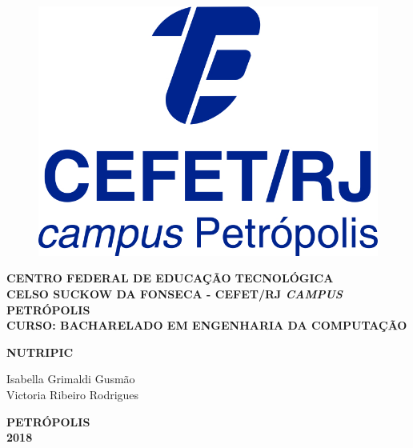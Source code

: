 \begin{figure}
\center
\includegraphics[height=0.15\textwidth]{Figs/logoCefetCampusPetropolis.jpg} 
\end{figure}


\vspace*{0.8cm}

\begin{center}
{\large \bf CENTRO FEDERAL DE EDUCAÇÃO TECNOLÓGICA} \vspace{1mm} \\
{\large \bf CELSO SUCKOW DA FONSECA - CEFET/RJ \textit{CAMPUS} PETRÓPOLIS} \vspace{1mm} \\
{\large \bf CURSO: BACHARELADO EM ENGENHARIA DA COMPUTAÇÃO}

\vspace*{5cm}
{\large \bf NUTRIPIC } \\
\end{center}
\vspace{4cm}
\hfill
	\begin{flushright}
	Isabella Grimaldi Gusmão \\
	Victoria Ribeiro Rodrigues
	\end{flushright}


\vspace*{3.3cm}
\begin{center}
{\bf PETRÓPOLIS \\ 2018}\\
\end{center}

\newpage
\pagestyle{empty}

